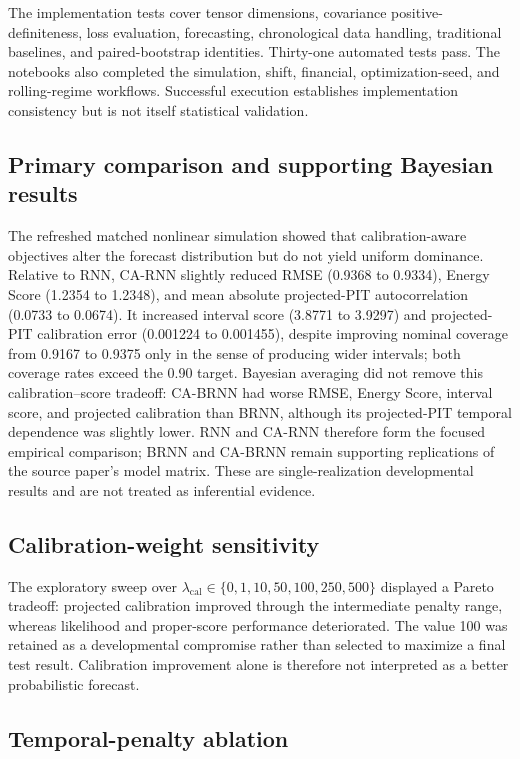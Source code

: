 \documentclass[11pt]{article}
\begin{document}
The implementation tests cover tensor dimensions, covariance
positive-definiteness, loss evaluation, forecasting, chronological data handling,
traditional baselines, and paired-bootstrap identities. Thirty-one automated
tests pass. The notebooks also
completed the simulation, shift, financial, optimization-seed, and rolling-regime
workflows. Successful execution establishes implementation consistency but is not
itself statistical validation.

\subsection{Primary comparison and supporting Bayesian results}

The refreshed matched nonlinear simulation showed that calibration-aware
objectives alter the forecast distribution but do not yield uniform dominance.
Relative to RNN, CA-RNN slightly reduced RMSE (0.9368 to 0.9334), Energy Score
(1.2354 to 1.2348), and mean absolute projected-PIT autocorrelation (0.0733 to
0.0674). It increased interval score (3.8771 to 3.9297) and projected-PIT
calibration error (0.001224 to 0.001455), despite improving nominal coverage
from 0.9167 to 0.9375 only in the sense of producing wider intervals; both
coverage rates exceed the 0.90 target. Bayesian averaging did not remove this
calibration--score tradeoff: CA-BRNN had worse RMSE, Energy Score, interval
score, and projected calibration than BRNN, although its projected-PIT temporal
dependence was slightly lower. RNN and CA-RNN therefore form the focused
empirical comparison; BRNN and CA-BRNN remain supporting replications of the
source paper's model matrix. These are single-realization developmental results
and are not treated as inferential evidence.

\subsection{Calibration-weight sensitivity}

The exploratory sweep over
$\lambda_{\mathrm{cal}}\in\{0,1,10,50,100,250,500\}$ displayed a Pareto
tradeoff: projected calibration improved through the intermediate penalty range,
whereas likelihood and proper-score performance deteriorated. The value 100 was
retained as a developmental compromise rather than selected to maximize a final
test result. Calibration improvement alone is therefore not interpreted as a
better probabilistic forecast.

\subsection{Temporal-penalty ablation}
\end{document}
